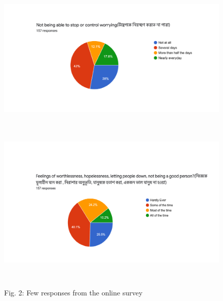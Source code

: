 
\begin{figure} [h]
\centering
\begin{minipage}{\textwidth}
  \centering
  \includegraphics[width=\linewidth,height=60mm]{figs/pie01.pdf}
  
  \label{pie01}
\end{minipage}%

\subcaption{}

\begin{minipage}{\textwidth}
  \centering
  \includegraphics[width=\textwidth,height=80mm]{figs/pie02.pdf}

  \label{pie02}
\end{minipage}%

\subcaption{}

{Fig. 2: Few responses from the online survey}


\label{response}
\end{figure}

